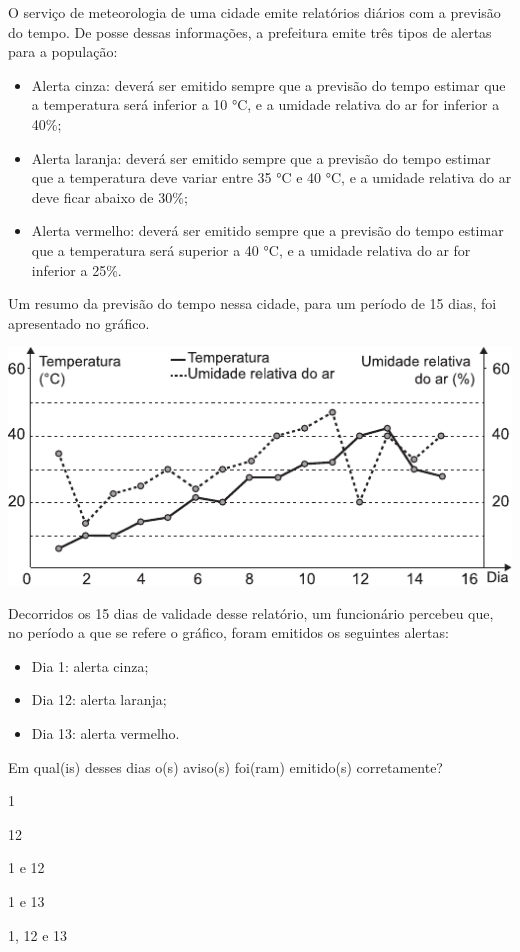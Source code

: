 \questao
O serviço de meteorologia de uma cidade emite relatórios diários com a previsão do tempo. De posse dessas informações, a prefeitura emite três tipos de alertas para a população:
\begin{itemize}
\item Alerta cinza: deverá ser emitido sempre que a previsão do tempo estimar que a temperatura será inferior a 10 °C, e a umidade relativa do ar for inferior a 40\%;
\item Alerta laranja: deverá ser emitido sempre que a previsão do tempo estimar que a temperatura deve variar entre 35 °C e 40 °C, e a umidade relativa do ar deve ficar abaixo de 30\%;
\item Alerta vermelho: deverá ser emitido sempre que a previsão do tempo estimar que a temperatura será superior a 40 °C, e a umidade relativa do ar for inferior a 25\%.
\end{itemize}
Um resumo da previsão do tempo nessa cidade, para um período de 15 dias, foi apresentado no gráfico.
\begin{center}
\includegraphics[width=\columnwidth]{subareas/ciencias_natureza/fisica-5.pdf}
\end{center}
Decorridos os 15 dias de validade desse relatório, um funcionário percebeu que, no período a que se refere o gráfico, foram emitidos os seguintes alertas:
\begin{itemize}
\item Dia 1: alerta cinza;
\item Dia 12: alerta laranja;
\item Dia 13: alerta vermelho.
\end{itemize}
Em qual(is) desses dias o(s) aviso(s) foi(ram) emitido(s) corretamente?
\begin{alternativas}
\item 1
\item 12
\item 1 e 12
\item 1 e 13
\item 1, 12 e 13
\end{alternativas}

